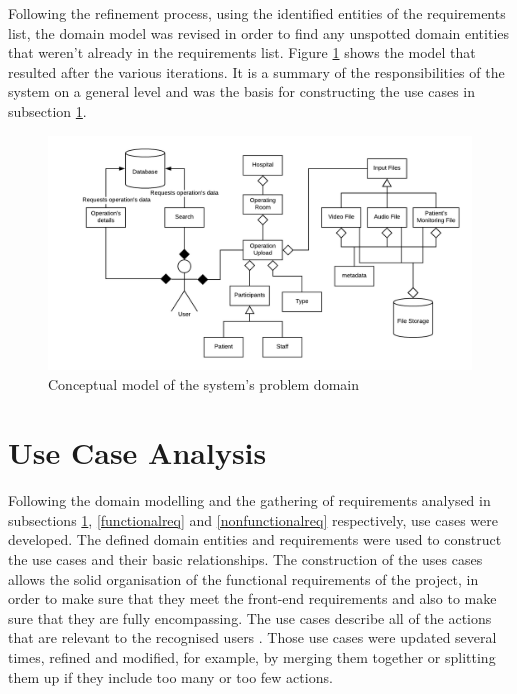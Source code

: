 Following the refinement process, using the identified entities of the requirements list, the domain model was revised in order to find any unspotted domain entities that weren't already in the requirements list. 
Figure \ref{domain_model} shows the model that resulted after the various iterations. It is a summary of the responsibilities of the system on a general level and was the basis for constructing the use cases in subsection \ref{sub:use_case_analysis}.

\begin{figure}[h]
\begin{center}
\includegraphics[width=17cm]{imgs/Domain_Model.png}
\end{center}\vspace{-0.3cm}
\caption[Domain Model]{Conceptual model of the system's problem domain} \label{domain_model}
\end{figure}



\section{Use Case Analysis}
\label{sub:use_case_analysis}

Following the domain modelling and the gathering of requirements analysed in subsections \ref{domain_model}, \ref{functionalreq} and \ref{nonfunctionalreq} respectively, use cases were developed. The defined domain entities and requirements were used to construct the use cases and their basic relationships. The construction of the uses cases allows the solid organisation of the functional requirements of the project, in order to make sure that they meet the front-end requirements and also to make sure that they are fully encompassing. The use cases describe all of the actions that are relevant to the recognised users \citep{usecases}. Those use cases were updated several times, refined and modified, for example, by merging them together or splitting them up if they include too many or too few actions.

